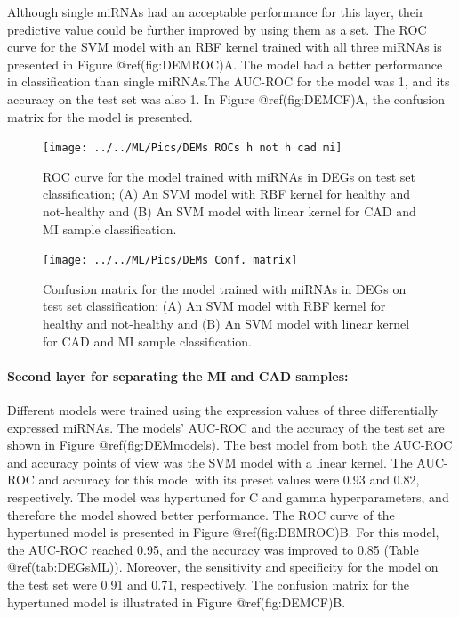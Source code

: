 \documentclass[smallextended]{svjour3}       %
\begin{document}
Although single miRNAs had an acceptable performance for this layer,
their predictive value could be further improved by using them as a set.
The ROC curve for the SVM model with an RBF kernel trained with all
three miRNAs is presented in Figure @ref(fig:DEMROC)A. The model had a
better performance in classification than single miRNAs.The AUC-ROC for
the model was 1, and its accuracy on the test set was also 1. In Figure
@ref(fig:DEMCF)A, the confusion matrix for the model is presented.

\begin{figure}

{\centering \texttt{[image: ../../ML/Pics/DEMs ROCs h not h cad mi]} 

}

\caption{ROC curve for the model trained with miRNAs in DEGs on test set classification; (A) An SVM model with RBF kernel for healthy and not-healthy and (B) An SVM model with linear kernel for CAD and MI sample classification.}\label{fig:DEMROC}
\end{figure}

\begin{figure}

{\centering \texttt{[image: ../../ML/Pics/DEMs Conf. matrix]} 

}

\caption{Confusion matrix for the model trained with miRNAs in DEGs on test set classification; (A) An SVM model with RBF kernel for healthy and not-healthy and (B) An SVM model with linear kernel for CAD and MI sample classification.}\label{fig:DEMCF}
\end{figure}

\hypertarget{second-layer-for-separating-the-mi-and-cad-samples-2}{%
\paragraph{Second layer for separating the MI and CAD
samples:}\label{second-layer-for-separating-the-mi-and-cad-samples-2}}

Different models were trained using the expression values of three
differentially expressed miRNAs. The models' AUC-ROC and the accuracy of
the test set are shown in Figure @ref(fig:DEMmodels). The best model
from both the AUC-ROC and accuracy points of view was the SVM model with
a linear kernel. The AUC-ROC and accuracy for this model with its preset
values were 0.93 and 0.82, respectively. The model was hypertuned for C
and gamma hyperparameters, and therefore the model showed better
performance. The ROC curve of the hypertuned model is presented in
Figure @ref(fig:DEMROC)B. For this model, the AUC-ROC reached 0.95, and
the accuracy was improved to 0.85 (Table @ref(tab:DEGsML)). Moreover,
the sensitivity and specificity for the model on the test set were 0.91
and 0.71, respectively. The confusion matrix for the hypertuned model is
illustrated in Figure @ref(fig:DEMCF)B.
\end{document}
